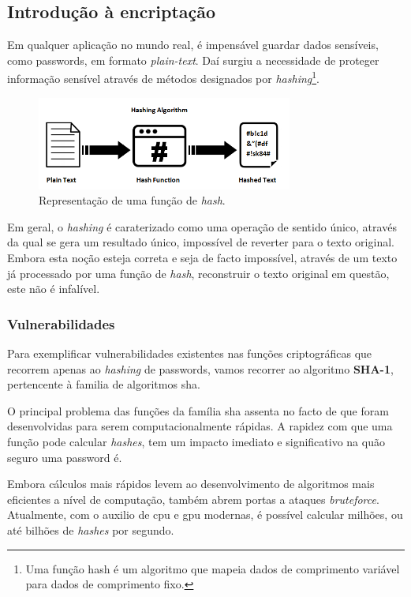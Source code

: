 \cleardoublepage
\subsection{Introdução à encriptação}

Em qualquer aplicação no mundo real, é impensável guardar dados sensíveis, como passwords, em formato \emph{plain-text}. Daí surgiu a necessidade de proteger informação sensível através de métodos designados por \emph{hashing}\footnote{Uma função hash é um algoritmo que mapeia dados de comprimento variável para dados de comprimento fixo.}.\\

\begin{figure}[h]
    \centering
    \includegraphics[width=0.75\textwidth]{img/bcrypt/Hashing.png}
    \caption{Representação de uma função de \emph{hash}.\cite{hashFunction}}
\end{figure}

Em geral, o \emph{hashing} é caraterizado como uma operação de sentido único, através da qual se gera um resultado único, impossível de reverter para o texto original.
Embora esta noção esteja correta e seja de facto impossível, através de um texto já processado por uma função de \emph{hash}, reconstruir o texto original em questão, este não é infalível.

\cleardoublepage
\subsubsection{Vulnerabilidades}

Para exemplificar vulnerabilidades existentes nas funções criptográficas que recorrem apenas ao \emph{hashing} de passwords, vamos recorrer ao algoritmo \textbf{SHA-1}, pertencente à familia de algoritmos \gls{sha}.

O principal problema das funções da família \gls{sha} assenta no facto de que foram desenvolvidas para serem computacionalmente rápidas. A rapidez com que uma função pode calcular \emph{hashes}, tem um impacto imediato e significativo na quão seguro uma password é.

Embora cálculos mais rápidos levem ao desenvolvimento de algoritmos mais eficientes a nível de computação, também abrem portas a ataques \emph{bruteforce}. Atualmente, com o auxilio de \gls{cpu} e \gls{gpu} modernas, é possível calcular milhões, ou até bilhões de \emph{hashes} por segundo.

